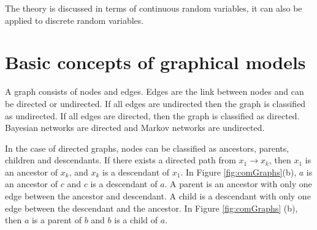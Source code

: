 \documentclass[12pt,oneside,openany,a4paper, %
afrikaans,english,
]{memoir}
\numberwithin{equation}{chapter}
\begin{document}
The theory is discussed in terms of continuous random variables, it can also be applied to discrete random variables. 
\section{Basic concepts of graphical models}
A graph consists of nodes and edges. Edges are the link between nodes and can be directed or undirected. If all edges are undirected then the graph is classified as undirected. If all edges are directed, then the graph is classified as directed. Bayesian networks are directed and Markov networks are undirected.

In the case of directed graphs, nodes can be classified as ancestors, parents, children and descendants. If there exists a directed path from $x_1 \to x_k$, then $x_1$ is an ancestor of $x_k$, and $x_k$ is a descendant of $x_1$. In Figure \ref{fig:comGraphs}(b), $a$ is an ancestor of $c$ and $c$ is a descendant of $a$. A parent is an ancestor with only one edge between the ancestor and descendant. A child is a descendant with only one edge between the descendant and the ancestor. In Figure \ref{fig:comGraphs} (b), then $a$ is a parent of $b$ and $b$ is a child of $a$.~\cite{barber}
\end{document}
